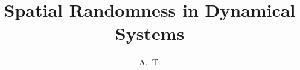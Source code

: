 \documentclass[defaultstyle,11pt]{thesis}
\title{Spatial Randomness in Dynamical Systems}
\author{A.~T.}{Le}
\begin{document}




\nocite{*}		%

\appendix
%
%
\end{document}

